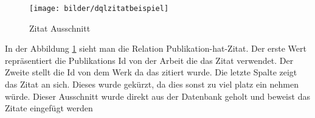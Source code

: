 \begin{figure}[!htb]
	\centering
	\texttt{[image: bilder/dqlzitatbeispiel]}
	\caption{Zitat Ausschnitt}
	\label{fig:dqlzitatbeispiel}
\end{figure}

In der Abbildung \ref{fig:dqlzitatbeispiel} sieht man die Relation Publikation-hat-Zitat. Der erste Wert repräsentiert die Publikations Id von der Arbeit die das Zitat verwendet. Der Zweite stellt die Id von dem Werk da das zitiert wurde. Die letzte Spalte zeigt das Zitat an sich. Dieses wurde gekürzt, da dies sonst zu viel platz ein nehmen würde. Dieser Ausschnitt wurde direkt aus der Datenbank geholt und beweist das Zitate eingefügt werden







